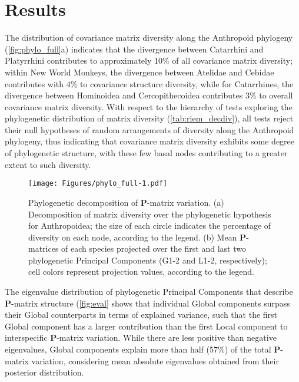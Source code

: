 \documentclass[12pt,twoside]{report}
\begin{document}
\section{Results}\label{results-2}

The distribution of covariance matrix diversity along the Anthropoid
phylogeny (\autoref{fig:phylo_full}a) indicates that the divergence
between Catarrhini and Platyrrhini contributes to approximately 10\% of
all covariance matrix diversity; within New World Monkeys, the
divergence between Atelidae and Cebidae contributes with 4\% to
covariance structure diversity, while for Catarrhines, the divergence
between Hominoidea and Cercopithecoidea contributes 3\% to overall
covariance matrix diversity. With respect to the hierarchy of tests
exploring the phylogenetic distribution of matrix diversity
(\autoref{tab:riem_decdiv}), all tests reject their null hypotheses of
random arrangements of diversity along the Anthropoid phylogeny, thus
indicating that covariance matrix diversity exhibits some degree of
phylogenetic structure, with these few basal nodes contributing to a
greater extent to such diversity.



\begin{figure}[htbp]
\centering
\texttt{[image: Figures/phylo\_full-1.pdf]}
\caption{Phylogenetic decomposition of $\mathbf{P}$-matrix variation.
(a) Decomposition of matrix diversity over the phylogenetic hypothesis
for Anthropoidea; the size of each circle indicates the percentage of
diversity on each node, according to the legend. (b) Mean
$\mathbf{P}$-matrices of each species projected over the first and last
two phylogenetic Principal Components (G1-2 and L1-2, respectively);
cell colors represent projection values, according to the legend.
\label{fig:phylo_full}}
\end{figure}

The eigenvalue distribution of phylogenetic Principal Components that
describe $\mathbf{P}$-matrix structure (\autoref{fig:eval} shows that
individual Global components surpass their Global counterparts in terms
of explained variance, such that the first Global component has a larger
contribution than the first Local component to interspecific
$\mathbf{P}$-matrix variation. While there are less positive than
negative eigenvalues, Global components explain more than half (57\%) of
the total $\mathbf{P}$-matrix variation, considering mean absolute
eigenvalues obtained from their posterior distribution.
\end{document}
